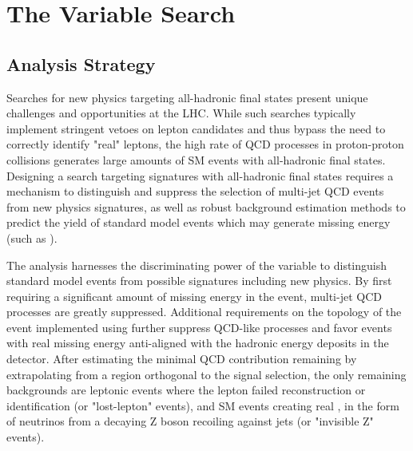 \chapter{The \mttwo Variable Search}
\label{ch:analysis}

\section{Analysis Strategy}
\label{sec:strategy}
Searches for new physics targeting all-hadronic final states present unique challenges and opportunities at the LHC. While such searches typically implement stringent vetoes on lepton candidates and thus bypass the need to correctly identify "real" leptons, the high rate of QCD processes in proton-proton collisions generates large amounts of SM events with all-hadronic final states. Designing a search targeting signatures with all-hadronic final states requires a mechanism to distinguish and suppress the selection of multi-jet QCD events from new physics signatures, as well as robust background estimation methods to predict the yield of standard model events which may generate missing energy (such as \znunu).

The \mttwo analysis harnesses the discriminating power of the \mttwo variable to distinguish standard model events from possible signatures including new physics. By first requiring a significant amount of missing energy in the event, multi-jet QCD processes are greatly suppressed. Additional requirements on the topology of the event implemented using \mttwo further suppress QCD-like processes and favor events with real missing energy anti-aligned with the hadronic energy deposits in the detector. After estimating the minimal QCD contribution remaining by extrapolating from a region orthogonal to the signal selection, the only remaining backgrounds are leptonic events where the lepton failed reconstruction or identification (or "lost-lepton" events), and SM events creating real \MET, in the form of neutrinos from a decaying Z boson recoiling against jets (or "invisible Z" events).

